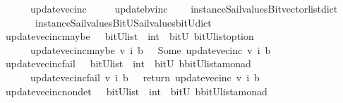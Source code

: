 \begin{isabellebody}
\ \ \ \ \ {\isachardoublequoteopen}\ update{\isacharunderscore}vec{\isacharunderscore}inc\ {\isacharequal}\ {\isacharparenleft}\ \isanewline
\ \ update{\isacharunderscore}bv{\isacharunderscore}inc\isanewline
\ \ \ \ {\isacharparenleft}instance{\isacharunderscore}Sail{}{\isacharunderscore}values{\isacharunderscore}Bitvector{\isacharunderscore}list{\isacharunderscore}dict\isanewline
\ \ \ \ \ \ \ instance{\isacharunderscore}Sail{}{\isacharunderscore}values{\isacharunderscore}BitU{\isacharunderscore}Sail{}{\isacharunderscore}values{\isacharunderscore}bitU{\isacharunderscore}dict{\isacharparenright}\ {\isacharparenright}{\isachardoublequoteclose}\isanewline
\isanewline
{}\isamarkupfalse%
\ update{\isacharunderscore}vec{\isacharunderscore}inc{\isacharunderscore}maybe\ \ {\isacharcolon}{\isacharcolon}\ {\isachardoublequoteopen}{\isacharparenleft}bitU{\isacharparenright}list\ {\isasymRightarrow}\ int\ {\isasymRightarrow}\ bitU\ {\isasymRightarrow}{\isacharparenleft}{\isacharparenleft}bitU{\isacharparenright}list{\isacharparenright}option\ {\isachardoublequoteclose}\ \ \ \isanewline
\ \ \ \ \ {\isachardoublequoteopen}\ update{\isacharunderscore}vec{\isacharunderscore}inc{\isacharunderscore}maybe\ v\ i\ b\ {\isacharequal}\ {\isacharparenleft}\ Some\ {\isacharparenleft}update{\isacharunderscore}vec{\isacharunderscore}inc\ v\ i\ b{\isacharparenright}{\isacharparenright}{\isachardoublequoteclose}\isanewline
\isanewline
{}\isamarkupfalse%
\ update{\isacharunderscore}vec{\isacharunderscore}inc{\isacharunderscore}fail\ \ {\isacharcolon}{\isacharcolon}\ {\isachardoublequoteopen}{\isacharparenleft}bitU{\isacharparenright}list\ {\isasymRightarrow}\ int\ {\isasymRightarrow}\ bitU\ {\isasymRightarrow}{\isacharparenleft}{\isacharprime}b{\isacharcomma}{\isacharparenleft}{\isacharparenleft}bitU{\isacharparenright}list{\isacharparenright}{\isacharcomma}{\isacharprime}a{\isacharparenright}monad\ {\isachardoublequoteclose}\ \ \ \isanewline
\ \ \ \ \ {\isachardoublequoteopen}\ update{\isacharunderscore}vec{\isacharunderscore}inc{\isacharunderscore}fail\ v\ i\ b\ {\isacharequal}\ {\isacharparenleft}\ return\ {\isacharparenleft}update{\isacharunderscore}vec{\isacharunderscore}inc\ v\ i\ b{\isacharparenright}{\isacharparenright}{\isachardoublequoteclose}\isanewline
\isanewline
{}\isamarkupfalse%
\ update{\isacharunderscore}vec{\isacharunderscore}inc{\isacharunderscore}nondet\ \ {\isacharcolon}{\isacharcolon}\ {\isachardoublequoteopen}{\isacharparenleft}bitU{\isacharparenright}list\ {\isasymRightarrow}\ int\ {\isasymRightarrow}\ bitU\ {\isasymRightarrow}{\isacharparenleft}{\isacharprime}b{\isacharcomma}{\isacharparenleft}{\isacharparenleft}bitU{\isacharparenright}list{\isacharparenright}{\isacharcomma}{\isacharprime}a{\isacharparenright}monad\ {\isachardoublequoteclose}\ \ \ \isanewline

\end{isabellebody}
